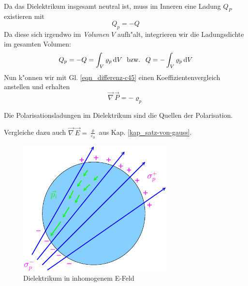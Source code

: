 Da das Dielektrikum insgesamt neutral ist, muss im Inneren eine Ladung
$Q_P$ existieren mit
\begin{equation*}
   Q_p = -Q
\end{equation*}
Da diese sich irgendwo im \emph{Volumen} $V$ aufh"alt, integrieren wir
die Ladungsdichte im gesamten Volumen:
\begin{equation}
   \label{eqn_differenz-c46}
   Q_p = -Q = \int_V \varrho_p \, \mathrm{d} V ~ \text{ bzw. } ~ Q = - \int_V
   \varrho_p \, \mathrm{d} V
\end{equation}
Nun k"onnen wir mit Gl. \eqref{eqn_differenz-c45} einen Koeffizientenvergleich
anstellen und erhalten
   \begin{equation}
   \label{eqn_differenz-c47}
\boxed{   \vec \nabla \, \vec P = - \varrho_p   }
\end{equation}
\begin{Wichtig}
Die Polarisationsladungen im Dielektrikum sind die Quellen der Polarisation.
\end{Wichtig}
Vergleiche dazu auch $\vec \nabla \, \vec E =
\frac{\varrho}{\varepsilon_0}$ aus Kap. \ref{kap_satz-von-gauss}.



\begin{figure}
   \centering
   \includegraphics[width=0.7\textwidth]{bilder/inhom_dielektr}
   \caption{Dielektrikum in inhomogenem E-Feld}
   \label{abb_inhom_dielektr}
\end{figure}


\bigskip

